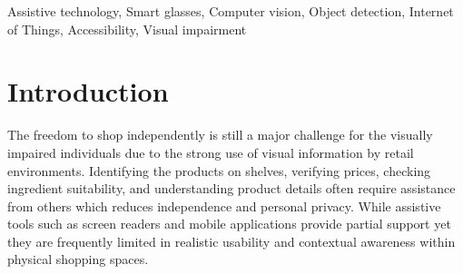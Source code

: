 \documentclass[conference]{IEEEtran}
\begin{document}
\maketitle


\begin{abstract}
Visual impairment significantly limits independent decision-making during in-store shopping activities such as product identification, price verification, and ingredient evaluation. This work presents \textit{Perceiva}, an artificial intelligence driven smart glasses system designed to assist visually impaired users through a modular, intent-driven architecture. The wearable platform integrates an onboard camera, microphone, and touch-based interaction to capture visual and auditory inputs, while a Raspberry Pi Zero 2 W performs edge-level coordination of perception and communication tasks. User commands are processed through a speech-to-text pipeline and analyzed using large language models to determine intent and dynamically activate functional modules, including product identification, currency recognition, medical compatibility analysis, price comparison, and volunteer-assisted video calling. Computer vision models enable real-time detection of retail products, while cloud-hosted reasoning services provide contextual decision support through audio feedback. Experimental evaluation demonstrates the feasibility of the proposed system with practical latency suitable for real-time interaction in retail environments. The compact wearable design aims to enhance independence, accessibility, and informed decision-making for visually impaired individuals during everyday shopping tasks.
\end{abstract}


\begin{IEEEkeywords}
Assistive technology, Smart glasses, Computer vision, Object detection, Internet of Things, Accessibility, Visual impairment
\end{IEEEkeywords}


\section{Introduction}
The freedom to shop independently is still a major challenge for the visually impaired individuals due to the strong use of visual information by retail environments. Identifying the products on shelves, verifying prices, checking ingredient suitability, and understanding product details often require assistance from others which reduces independence and personal privacy. While assistive tools such as screen readers and mobile applications provide partial support yet they are frequently limited in realistic usability and contextual awareness within physical shopping spaces.
\end{document}
